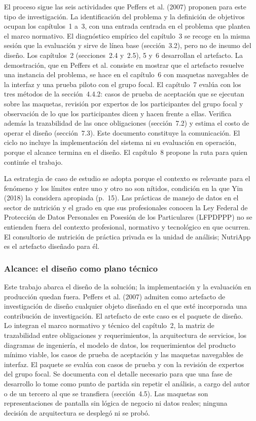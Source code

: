 \documentclass[12pt, a4paper]{article}
\begin{document}
El proceso sigue las seis actividades que Peffers et al. (2007) proponen
para este tipo de investigación. La identificación del problema y la
definición de objetivos ocupan los capítulos~1 a~3, con una entrada
centrada en el problema que plantea el marco normativo. El diagnóstico
empírico del capítulo~3 se recoge en la misma sesión que la evaluación y
sirve de línea base (sección~3.2), pero no de insumo del diseño. Los
capítulos~2 (secciones~2.4 y~2.5), 5 y~6 desarrollan el artefacto. La
demostración, que en Peffers et al. consiste en mostrar que el artefacto
resuelve una instancia del problema, se hace en el capítulo~6 con
maquetas navegables de la interfaz y una prueba piloto con el grupo
focal. El capítulo~7 evalúa con los tres métodos de la sección~4.4.2:
casos de prueba de aceptación que se ejecutan sobre las maquetas,
revisión por expertos de los participantes del grupo focal y observación
de lo que los participantes dicen y hacen frente a ellas. Verifica
además la trazabilidad de las once obligaciones (sección~7.2) y estima
el costo de operar el diseño (sección~7.3). Este documento constituye la
comunicación. El ciclo no incluye la implementación del sistema ni su
evaluación en operación, porque el alcance termina en el diseño. El
capítulo~8 propone la ruta para quien continúe el trabajo.
 
La estrategia de caso de estudio se adopta porque el contexto es
relevante para el fenómeno y los límites entre uno y otro no son
nítidos, condición en la que Yin (2018) la considera apropiada
(p.~15). Las prácticas de manejo de datos en el sector de nutrición y
el grado en que sus profesionales conocen la Ley Federal de Protección de Datos Personales en Posesión de los Particulares (LFPDPPP) no se entienden
fuera del contexto profesional, normativo y tecnológico en que
ocurren. El consultorio de nutrición de práctica privada es la unidad de
análisis; NutriApp es el artefacto diseñado para él.
 
\subsubsection{Alcance: el diseño como plano técnico}
 
Este trabajo abarca el diseño de la solución; la implementación y la
evaluación en producción quedan fuera. Peffers et al. (2007) admiten
como artefacto de investigación de diseño cualquier objeto diseñado en
el que esté incorporada una contribución de investigación. El artefacto
de este caso es el paquete de diseño. Lo integran el marco normativo y
técnico del capítulo~2, la matriz de trazabilidad entre obligaciones
y requerimientos, la arquitectura de servicios, los diagramas de
ingeniería, el modelo de datos, los requerimientos del producto mínimo
viable, los casos de prueba de aceptación y las maquetas navegables de
interfaz. El paquete se evalúa con casos de prueba y con la revisión de
expertos del grupo focal. Se documenta con el detalle necesario para que
una fase de desarrollo lo tome como punto de partida sin repetir el
análisis, a cargo del autor o de un tercero al que se transfiera
(sección~4.5). Las maquetas son representaciones de pantalla sin lógica
de negocio ni datos reales; ninguna decisión de arquitectura se desplegó
ni se probó.
 
\end{document}
